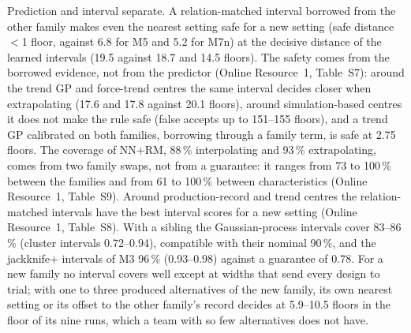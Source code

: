 \documentclass[pdflatex,sn-basic,lineno]{sn-jnl}
\newcommand{\ORt}[1]{Online Resource~1, Table~S#1}
\begin{document}
Prediction and interval separate. A relation-matched interval borrowed from the other family makes even the nearest setting safe for a new setting (safe distance $<$1 floor, against 6.8 for M5 and 5.2 for M7n) at the decisive distance of the learned intervals (19.5 against 18.7 and 14.5 floors). The safety comes from the borrowed evidence, not from the predictor (\ORt{7}): around the trend GP and force-trend centres the same interval decides closer when extrapolating (17.6 and 17.8 against 20.1 floors), around simulation-based centres it does not make the rule safe (false accepts up to 151--155 floors), and a trend GP calibrated on both families, borrowing through a family term, is safe at 2.75 floors. The coverage of NN+RM, 88\,\% interpolating and 93\,\% extrapolating, comes from two family swaps, not from a guarantee: it ranges from 73 to 100\,\% between the families and from 61 to 100\,\% between characteristics (\ORt{9}). Around production-record and trend centres the relation-matched intervals have the best interval scores \citep{gneiting2007strictly} for a new setting (\ORt{8}). With a sibling the Gaussian-process intervals cover 83--86\,\% (cluster intervals 0.72--0.94), compatible with their nominal 90\,\%, and the jackknife+ intervals of M3 96\,\% (0.93--0.98) against a guarantee of 0.78. For a new family no interval covers well except at widths that send every design to trial; with one to three produced alternatives of the new family, its own nearest setting or its offset to the other family's record decides at 5.9--10.5 floors in the floor of its nine runs, which a team with so few alternatives does not have.
\end{document}
